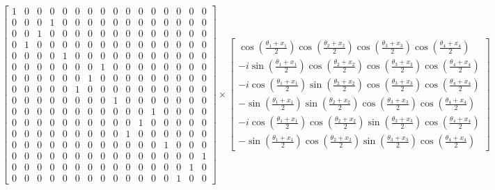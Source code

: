 \documentclass[12pt]{article}
\numberwithin{equation}{section}  %
\theoremstyle{definition}
\theoremstyle{plain}
\theoremstyle{remark}
\begin{document}
\begingroup
\setlength{\arraycolsep}{3pt}
\begin{equation*}
\begin{bmatrix}
1&0&0&0&0&0&0&0&0&0&0&0&0&0&0&0\\
0&0&0&1&0&0&0&0&0&0&0&0&0&0&0&0\\
0&0&1&0&0&0&0&0&0&0&0&0&0&0&0&0\\
0&1&0&0&0&0&0&0&0&0&0&0&0&0&0&0\\
0&0&0&0&1&0&0&0&0&0&0&0&0&0&0&0\\
0&0&0&0&0&0&0&1&0&0&0&0&0&0&0&0\\
0&0&0&0&0&0&1&0&0&0&0&0&0&0&0&0\\
0&0&0&0&0&1&0&0&0&0&0&0&0&0&0&0\\
0&0&0&0&0&0&0&0&1&0&0&0&0&0&0&0\\
0&0&0&0&0&0&0&0&0&0&0&1&0&0&0&0\\
0&0&0&0&0&0&0&0&0&0&1&0&0&0&0&0\\
0&0&0&0&0&0&0&0&0&1&0&0&0&0&0&0\\
0&0&0&0&0&0&0&0&0&0&0&0&1&0&0&0\\
0&0&0&0&0&0&0&0&0&0&0&0&0&0&0&1\\
0&0&0&0&0&0&0&0&0&0&0&0&0&0&1&0\\
0&0&0&0&0&0&0&0&0&0&0&0&0&1&0&0
\end{bmatrix}
\times \begin{bmatrix}
\cos\left(\frac{\theta_1+x_1}{2}\right)
\cos\left(\frac{\theta_2+x_2}{2}\right)
\cos\left(\frac{\theta_3+x_3}{2}\right)
\cos\left(\frac{\theta_4+x_4}{2}\right)
\\[6pt]
-i\sin\left(\frac{\theta_1+x_1}{2}\right)
\cos\left(\frac{\theta_2+x_2}{2}\right)
\cos\left(\frac{\theta_3+x_3}{2}\right)
\cos\left(\frac{\theta_4+x_4}{2}\right)
\\[6pt]
-i\cos\left(\frac{\theta_1+x_1}{2}\right)
\sin\left(\frac{\theta_2+x_2}{2}\right)
\cos\left(\frac{\theta_3+x_3}{2}\right)
\cos\left(\frac{\theta_4+x_4}{2}\right)
\\[6pt]
-\sin\left(\frac{\theta_1+x_1}{2}\right)
\sin\left(\frac{\theta_2+x_2}{2}\right)
\cos\left(\frac{\theta_3+x_3}{2}\right)
\cos\left(\frac{\theta_4+x_4}{2}\right)
\\[6pt]
-i\cos\left(\frac{\theta_1+x_1}{2}\right)
\cos\left(\frac{\theta_2+x_2}{2}\right)
\sin\left(\frac{\theta_3+x_3}{2}\right)
\cos\left(\frac{\theta_4+x_4}{2}\right)
\\[6pt]
-\sin\left(\frac{\theta_1+x_1}{2}\right)
\cos\left(\frac{\theta_2+x_2}{2}\right)
\sin\left(\frac{\theta_3+x_3}{2}\right)
\cos\left(\frac{\theta_4+x_4}{2}\right)

\end{bmatrix}
\end{equation*}
\end{document}
